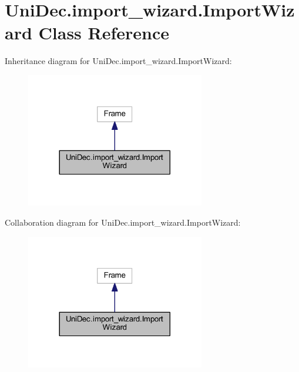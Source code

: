 \hypertarget{class_uni_dec_1_1import__wizard_1_1_import_wizard}{}\section{Uni\+Dec.\+import\+\_\+wizard.\+Import\+Wizard Class Reference}
\label{class_uni_dec_1_1import__wizard_1_1_import_wizard}


Inheritance diagram for Uni\+Dec.\+import\+\_\+wizard.\+Import\+Wizard\+:\nopagebreak
\begin{figure}[H]
\begin{center}
\leavevmode
\includegraphics[width=221pt]{class_uni_dec_1_1import__wizard_1_1_import_wizard__inherit__graph}
\end{center}
\end{figure}


Collaboration diagram for Uni\+Dec.\+import\+\_\+wizard.\+Import\+Wizard\+:\nopagebreak
\begin{figure}[H]
\begin{center}
\leavevmode
\includegraphics[width=221pt]{class_uni_dec_1_1import__wizard_1_1_import_wizard__coll__graph}
\end{center}
\end{figure}
